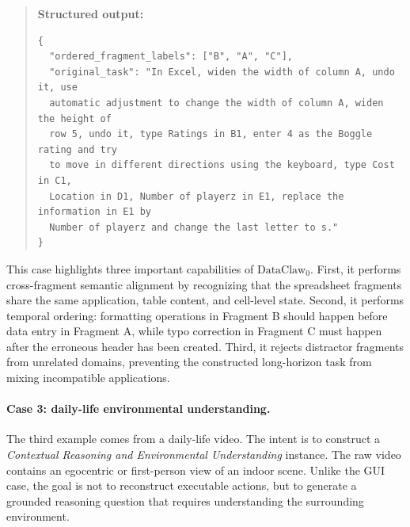 \documentclass{llmxive}
\begin{document}
\begin{quote}
\textbf{Structured output:}
\begin{verbatim}
{
  "ordered_fragment_labels": ["B", "A", "C"],
  "original_task": "In Excel, widen the width of column A, undo it, use
  automatic adjustment to change the width of column A, widen the height of
  row 5, undo it, type Ratings in B1, enter 4 as the Boggle rating and try
  to move in different directions using the keyboard, type Cost in C1,
  Location in D1, Number of playerz in E1, replace the information in E1 by
  Number of playerz and change the last letter to s."
}
\end{verbatim}
\end{quote}

This case highlights three important capabilities of $\text{DataClaw}_0$. First, it performs cross-fragment semantic alignment by recognizing that the spreadsheet fragments share the same application, table content, and cell-level state. Second, it performs temporal ordering: formatting operations in Fragment B should happen before data entry in Fragment A, while typo correction in Fragment C must happen after the erroneous header has been created. Third, it rejects distractor fragments from unrelated domains, preventing the constructed long-horizon task from mixing incompatible applications.

\paragraph{Case 3: daily-life environmental understanding.}
The third example comes from a daily-life video. The intent is to construct a \emph{Contextual Reasoning and Environmental Understanding} instance. The raw video contains an egocentric or first-person view of an indoor scene. Unlike the GUI case, the goal is not to reconstruct executable actions, but to generate a grounded reasoning question that requires understanding the surrounding environment.
\end{document}
